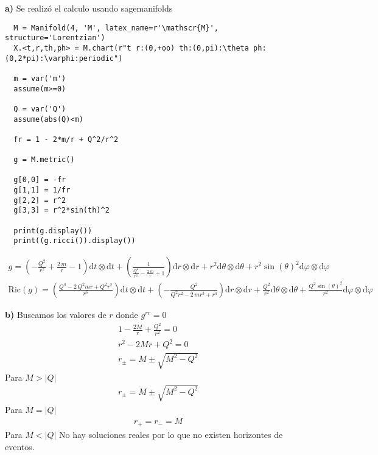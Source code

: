 \documentclass{article}
\begin{document}
\textbf{a) } Se realizó el calculo usando sagemanifolds 
\begin{verbatim}
  M = Manifold(4, 'M', latex_name=r'\mathscr{M}', structure='Lorentzian')
  X.<t,r,th,ph> = M.chart(r"t r:(0,+oo) th:(0,pi):\theta ph:(0,2*pi):\varphi:periodic")

  m = var('m')
  assume(m>=0)

  Q = var('Q')
  assume(abs(Q)<m)

  fr = 1 - 2*m/r + Q^2/r^2

  g = M.metric()

  g[0,0] = -fr
  g[1,1] = 1/fr
  g[2,2] = r^2
  g[3,3] = r^2*sin(th)^2

  print(g.display())
  print((g.ricci()).display())
\end{verbatim}
\begin{gather*}
  g = \left( -\frac{Q^{2}}{r^{2}} + \frac{2 \, m}{r} - 1 \right) \mathrm{d} t\otimes \mathrm{d} t + \left( \frac{1}{\frac{Q^{2}}{r^{2}} - \frac{2 \, m}{r} + 1} \right) \mathrm{d} r\otimes \mathrm{d} r + r^{2} \mathrm{d} {\theta}\otimes \mathrm{d} {\theta} + r^{2} \sin\left({\theta}\right)^{2} \mathrm{d} {\varphi}\otimes \mathrm{d} {\varphi} \\
\mathrm{Ric}\left(g\right) = \left( \frac{Q^{4} - 2 \, Q^{2} m r + Q^{2} r^{2}}{r^{6}} \right) \mathrm{d} t\otimes \mathrm{d} t + \left( -\frac{Q^{2}}{Q^{2} r^{2} - 2 \, m r^{3} + r^{4}} \right) \mathrm{d} r\otimes \mathrm{d} r + \frac{Q^{2}}{r^{2}} \mathrm{d} {\theta}\otimes \mathrm{d} {\theta} + \frac{Q^{2} \sin\left({\theta}\right)^{2}}{r^{2}} \mathrm{d} {\varphi}\otimes \mathrm{d} {\varphi} 
\end{gather*}

\textbf{b) } Buscamos los valores de $ r  $ donde $ g ^ {rr } = 0  $
\begin{gather*}
  1 - \frac{2M }{r} + \frac{Q^2 }{r^2 } = 0 \\
  r^2 - 2Mr + Q^2 = 0 \\
  r _{\pm } = M \pm \sqrt{M^2 - Q^2 } 
\end{gather*}
Para $ M > \left|Q \right| $
\begin{gather*}
  r _{\pm } = M \pm \sqrt{M^2 - Q^2 }  
\end{gather*}
Para $ M = \left|Q \right| $
\begin{gather*}
  r _{+  } = r _{-   } = M 
\end{gather*}
Para $ M < \left|Q \right| $ No hay soluciones reales por lo que no existen horizontes de eventos.
\end{document}
